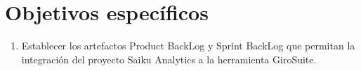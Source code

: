 \section{Objetivos espec\'{i}ficos}
\begin{spacing}{1.5}
	\begin{enumerate}[label=\alph*)]
		\item Establecer los artefactos Product BackLog y Sprint BackLog que permitan la integraci\'{o}n del proyecto Saiku Analytics a la herramienta GiroSuite.
		
		
		
	\end{enumerate}	
\end{spacing}


	
